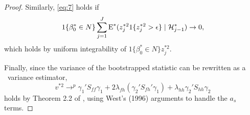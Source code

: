 \documentclass[12pt,fleqn]{article}
\begin{document}
\begin{proof}
   Similarly, \eqref{eq:7} holds if
   \begin{equation*}
     1\{\beta_0^* \in N\} \sum_{j=1}^J \operatorname{E}^*(z_j^{*2} 1\{z_j^{*2} > \epsilon\} \mid \mathcal{H}_{j-1}^*) \to 0,
   \end{equation*}
   which holds by uniform integrability of $1\{\beta_0^* \in N\} z_j^{*2}$.

   Finally, since the variance of the bootstrapped statistic can be
   rewritten as a \hac\ variance estimator,
   \begin{equation*}
     v^{*2} \to^p \gamma_1' S_{ff} \gamma_1 + 2 \lambda_{fh} (\gamma_2' S_{fh}' \gamma_1)
     + \lambda_{hh} \gamma_2' S_{hh} \gamma_2
   \end{equation*}
   holds by Theorem 2.2 of \cite{JoD:00}, using West's (1996)
   arguments to handle the $a_s$ terms.
\end{proof}


\end{document}
